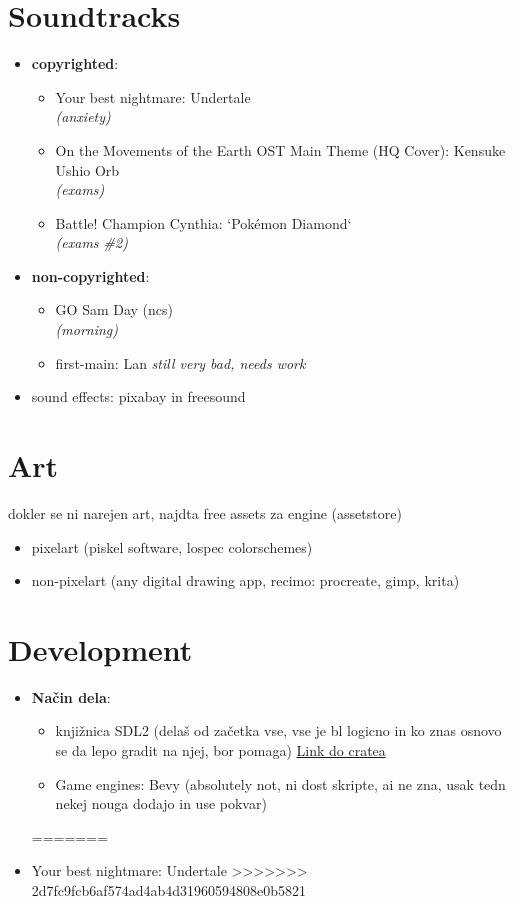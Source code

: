 \documentclass[a4paper]{article}
\begin{document}
\section{Soundtracks}
\begin{itemize}
<<<<<<< HEAD
    \item \textbf{copyrighted}: \begin{itemize}
        \item Your best nightmare: Undertale \\
        \textsl{(anxiety)}
        \item On the Movements of the Earth OST \- Main Theme (HQ Cover): Kensuke Ushio Orb \\
        \textsl{(exams)}
        \item Battle! Champion Cynthia: `Pokémon Diamond`\\
        \textsl{(exams \#2)}
    \end{itemize}
    
    \item \textbf{non-copyrighted}: \begin{itemize}
        \item GO\: Sam Day (ncs) \\
        \textsl{(morning)}
        \item first-main: Lan
        \textsl{still very bad, needs work}
    \end{itemize}
    \item sound effects: pixabay in freesound
\end{itemize}

\section{Art}
dokler se ni narejen art, najdta free assets za engine (assetstore)
\begin{itemize}
    \item pixelart (piskel \- software, lospec \- colorschemes)
    \item non-pixelart (any digital drawing app, recimo: procreate, gimp, krita)
\end{itemize}

\section{Development}
\begin{itemize}
    \item \textbf{Način dela}: \begin{itemize}
        \item knjižnica SDL2 (delaš od začetka vse, vse je bl logicno in ko znas osnovo se da lepo gradit na njej, bor pomaga) \href{https://crates.io/crates/sdl1_2-rs}{Link do cratea}
        \item Game engines: Bevy (absolutely not, ni dost skripte, ai ne zna, usak tedn nekej nouga dodajo in use pokvar)
    \end{itemize}
=======
    \item Your best nightmare: Undertale
>>>>>>> 2d7fc9fcb6af574ad4ab4d31960594808e0b5821
\end{itemize}
\end{document}
